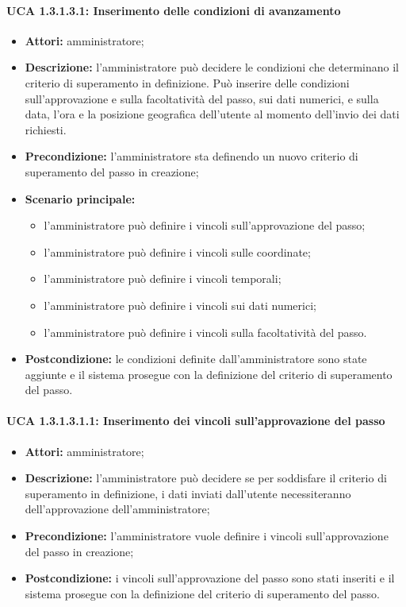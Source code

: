 \paragraph{UCA 1.3.1.3.1: Inserimento delle condizioni di avanzamento}
\begin{itemize}
\item \textbf{Attori:} 
amministratore;
\item \textbf{Descrizione:} 
l'amministratore può decidere le condizioni che determinano il criterio di superamento in definizione.
Può inserire delle condizioni sull'approvazione e sulla facoltatività del passo, sui dati numerici, e sulla data, l'ora e la posizione geografica dell'utente al momento dell'invio dei dati richiesti.
\item \textbf{Precondizione:} 
l'amministratore sta definendo un nuovo criterio di superamento del passo in creazione;
\item \textbf{Scenario principale:} 
\begin{itemize}
\item l'amministratore può definire i vincoli sull'approvazione del passo;
\item l'amministratore può definire i vincoli sulle coordinate;
\item l'amministratore può definire i vincoli temporali;
\item l'amministratore può definire i vincoli sui dati numerici;
\item l'amministratore può definire i vincoli sulla facoltatività del passo.
\end{itemize}
\item \textbf{Postcondizione:}
le condizioni definite dall'amministratore sono state aggiunte e il sistema prosegue con la definizione del criterio di superamento del passo.
\end{itemize}

\paragraph{UCA 1.3.1.3.1.1: Inserimento dei vincoli sull'approvazione del passo}
\begin{itemize}
\item \textbf{Attori:} 
amministratore;
\item \textbf{Descrizione:} 
l'amministratore può decidere se per soddisfare il criterio di superamento in definizione, i dati inviati dall'utente necessiteranno dell'approvazione dell'amministratore;
\item \textbf{Precondizione:} 
l'amministratore vuole definire i vincoli sull'approvazione del passo in creazione;
\item \textbf{Postcondizione:}
i vincoli sull'approvazione del passo sono stati inseriti e il sistema prosegue con la definizione del criterio di superamento del passo.
\end{itemize}

